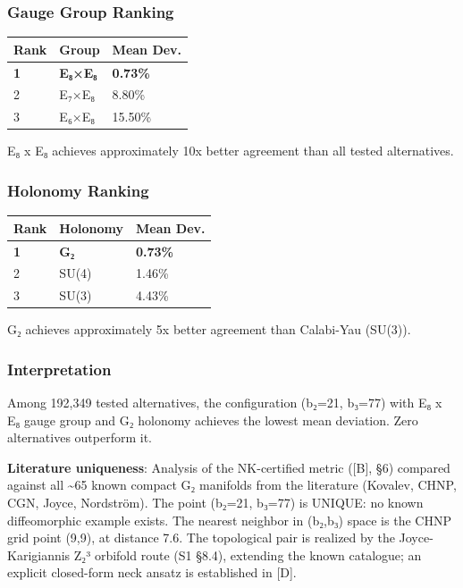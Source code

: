 \documentclass[11pt,a4paper]{article}
\begin{document}
\subsubsection{Gauge Group Ranking}\label{gauge-group-ranking}

{\def\LTcaptype{none} %
\begin{longtable}[]{@{}lll@{}}
\toprule\noalign{}
Rank & Group & Mean Dev. \\
\midrule\noalign{}
\endhead
\bottomrule\noalign{}
\endlastfoot
\textbf{1} & \textbf{E₈×E₈} & \textbf{0.73\%} \\
2 & E₇×E₈ & 8.80\% \\
3 & E₆×E₈ & 15.50\% \\
\end{longtable}
}

E₈ x E₈ achieves approximately 10x better agreement than all tested alternatives.

\subsubsection{Holonomy Ranking}\label{holonomy-ranking}

{\def\LTcaptype{none} %
\begin{longtable}[]{@{}lll@{}}
\toprule\noalign{}
Rank & Holonomy & Mean Dev. \\
\midrule\noalign{}
\endhead
\bottomrule\noalign{}
\endlastfoot
\textbf{1} & \textbf{G₂} & \textbf{0.73\%} \\
2 & SU(4) & 1.46\% \\
3 & SU(3) & 4.43\% \\
\end{longtable}
}

G₂ achieves approximately 5x better agreement than Calabi-Yau (SU(3)).

\subsubsection{Interpretation}\label{interpretation-1}

Among 192,349 tested alternatives, the configuration (b₂=21, b₃=77) with E₈ x E₈ gauge group and G₂ holonomy achieves the lowest mean deviation. Zero alternatives outperform it.

\textbf{Literature uniqueness}: Analysis of the NK-certified metric ([B], §6) compared against all \textasciitilde65 known compact G₂ manifolds from the literature (Kovalev, CHNP, CGN, Joyce, Nordström). The point (b₂=21, b₃=77) is UNIQUE: no known diffeomorphic example exists. The nearest neighbor in (b₂,b₃) space is the CHNP grid point (9,9), at distance 7.6. The topological pair is realized by the Joyce-Karigiannis Z₂³ orbifold route (S1 §8.4), extending the known catalogue; an explicit closed-form neck ansatz is established in [D].
\end{document}
